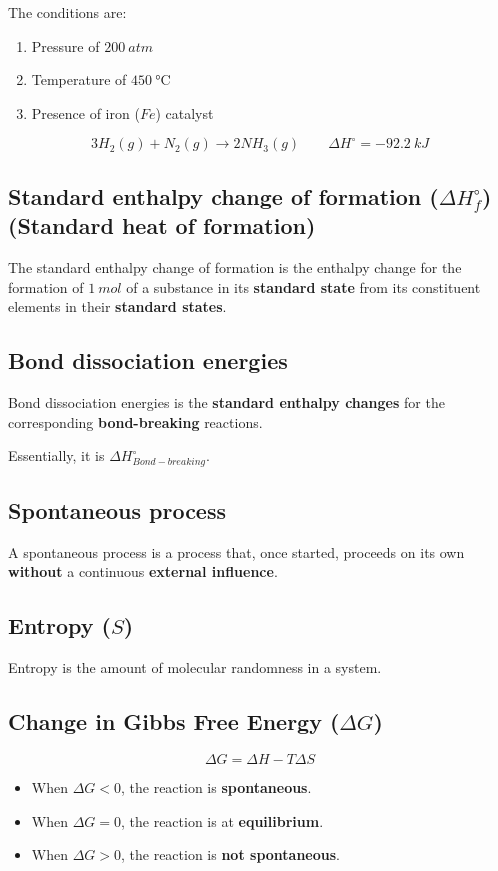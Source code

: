 \documentclass[11pt]{article}
\begin{document}
The conditions are:
\begin{enumerate}
\item Pressure of \(\qty{200}{\unit{atm}}\)
\item Temperature of \(\qty{450}{\unit{\degreeCelsius}}\)
\item Presence of iron (\(Fe\)) catalyst
\end{enumerate}

\[3H_2 (g) + N_2 (g) \rightarrow 2NH_3 (g) \qquad \Delta H^\circ = -\qty{92.2}{\unit{kJ}}\]
\subsection{Standard enthalpy change of formation (\(\Delta H^\circ_f\)) (Standard heat of formation)}
\label{sec:org360a510}
The standard enthalpy change of formation is the enthalpy change for the formation of \(\qty{1}{\unit{mol}}\) of a substance in its \textbf{standard state} from its constituent elements in their \textbf{standard states}.
\subsection{Bond dissociation energies}
\label{sec:orgb158c4e}
Bond dissociation energies is the \textbf{standard enthalpy changes} for the corresponding \textbf{bond-breaking} reactions.


Essentially, it is \(\Delta H^\circ_{Bond-breaking}\).
\subsection{Spontaneous process}
\label{sec:org67f1942}
A spontaneous process is a process that, once started, proceeds on its own \textbf{without} a continuous \textbf{external influence}.
\subsection{Entropy (\(S\))}
\label{sec:org852f98a}
Entropy is the amount of molecular randomness in a system.
\subsection{Change in Gibbs Free Energy (\(\Delta G\))}
\label{sec:orgd04d0e5}
\[\Delta G = \Delta H - T \Delta S\]

\begin{itemize}
\item When \(\Delta G < 0\), the reaction is \textbf{spontaneous}.
\item When \(\Delta G = 0\), the reaction is at \textbf{equilibrium}.
\item When \(\Delta G > 0\), the reaction is \textbf{not spontaneous}.
\end{itemize}
\end{document}
